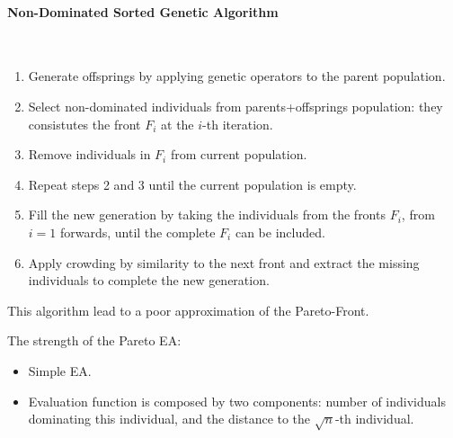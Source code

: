 \documentclass{article}
\begin{document}
\paragraph{Non-Dominated Sorted Genetic Algorithm}\mbox{}\\
\begin{enumerate}
    \item Generate offsprings by applying genetic operators to the parent population.
    \item Select non-dominated individuals from parents+offsprings population: they consistutes
    the front $F_i$ at the $i$-th iteration.
    \item Remove individuals in $F_i$ from current population.
    \item Repeat steps 2 and 3 until the current population is empty.
    \item Fill the new generation by taking the individuals from the fronts $F_i$, from $i=1$ forwards,
    until the complete $F_i$ can be included.
    \item Apply crowding by similarity to the next front and extract the missing individuals to complete the
    new generation.
\end{enumerate}
This algorithm lead to a poor approximation of the Pareto-Front.

The strength of the Pareto EA:
\begin{itemize}
    \item Simple EA.
    \item Evaluation function is composed by two components: number of individuals dominating
    this individual, and the distance to the $\sqrt{n}$-th individual.
\end{itemize}
\end{document}
